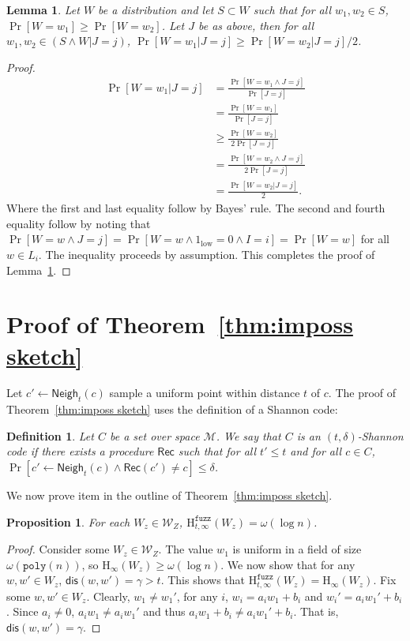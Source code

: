 \documentclass[11pt]{article}
\newcommand{\thref}[1]{\mbox{Theorem~\ref{#1}}}
\newcommand{\lemref}[1]{\mbox{Lemma~\ref{#1}}}
\newcommand{\class}[1]{{\ensuremath{\mathsf{#1}}}}
\newcommand{\rec}{\ensuremath{\class{Rec}}\xspace}
\newcommand{\neigh}{\ensuremath{\class{Neigh}}\xspace}
\newcommand{\dis}{\ensuremath{\mathsf{dis}}}
\newcommand{\poly}{\ensuremath{\mathtt{poly}}\xspace}
\newcommand{\Hoo}{\mathrm{H}_\infty}
\newcommand{\Hfuzz}{\mathrm{H}^{\mathtt{fuzz}}_{t,\infty}}
\newtheorem{lemma}[theorem]{Lemma}
\newtheorem{proposition}[theorem]{Proposition}
\newtheorem{definition}[theorem]{Definition}
\begin{document}
\begin{lemma}
\label{lem:nearly flat after conditioning}
Let $W$ be a distribution and let $S\subset W$ such that for all $w_1, w_2 \in S$, $\Pr[W=w_1]\ge \Pr[W=w_2]$.  Let $J$ be as above, then for all $w_1, w_2 \in (S \wedge W|J=j )$, $\Pr[W=w_1 | J=j]\ge \Pr[W=w_2 | J=j]/2$.
\end{lemma}
\begin{proof}
\begin{align*}
\Pr[W=w_1 | J=j] &=\frac{\Pr[W=w_1\wedge J=j] }{\Pr[J=j]}\\
&= \frac{\Pr[W=w_1]}{\Pr[J=j]}\\
&\ge \frac{\Pr[W=w_2]}{2 \Pr[J=j]}\\
&= \frac{\Pr[W=w_2 \wedge J=j]}{2\Pr[J=j]}\\
&=\frac{\Pr[W=w_2 | J=j]}{2}.
\end{align*}
Where the first and last equality follow by Bayes' rule.  The second and fourth equality follow by noting that $\Pr[W=w \wedge J=j] = \Pr[W=w \wedge 1_{\text{low}}=0 \wedge I=i] = \Pr[W=w]$ for all $w\in L_i$.  The inequality proceeds by assumption.  This completes the proof of \lemref{lem:nearly flat after conditioning}.
\end{proof}

\section{Proof of \thref{thm:imposs sketch}}
\label{sec:proof secure sketch imposs}
Let $c'\leftarrow \neigh_t(c)$ sample a uniform point within distance $t$ of $c$.  
The proof of \thref{thm:imposs sketch} uses the definition of a Shannon code: 
\begin{definition}
\label{def:shannon-code}
Let $C$ be a set over space $\mathcal{M}$.  We say that $C$ is an $(t,\delta)$-\emph{Shannon code} if there exists a procedure $\rec$ such that for all $t'\le t$ and for all $c\in C$, $\Pr[c'\leftarrow \neigh_t(c) \wedge \rec(c') \neq c]\le \delta$. %
\end{definition}

\noindent
We now prove item in the outline of \thref{thm:imposs sketch}.

\begin{proposition} 
\label{prop:each element good} For each $W_z\in\mathcal{W}_Z$, $\Hfuzz(W_z) = \omega(\log n)$.
\end{proposition}
\begin{proof}
Consider some $W_z\in\mathcal{W}_Z$.  The value $w_1$ is uniform in a field of size $\omega(\poly(n))$, so $\Hoo(W_z) \ge \omega(\log n)$.  We now show that for any $w, w'\in W_z$, $\dis(w, w') = \gamma>t$.  This shows that $\Hfuzz(W_z) = \Hoo(W_z)$.  Fix some $w, w'\in W_z$.  Clearly, $w_1 \neq w_1'$, for any $i$, $w_i = a_i w_1 + b_i$ and $w_i' = a_i w_1' + b_i$.  Since $a_i\neq 0$, $a_iw_1 \neq a_iw_1'$ and thus $a_iw_1+b_i \neq a_iw_1'+b_i$.  That is, $\dis (w, w')  =\gamma$.
\end{proof}
\end{document}
